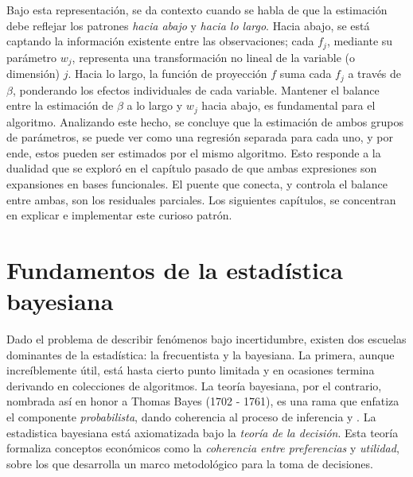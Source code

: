 \documentclass[../Main/Main.tex]{subfiles}
\begin{document}
Bajo esta representación, se da contexto cuando se habla de que la estimación debe reflejar los patrones \textit{hacia abajo} y \textit{hacia lo largo}. Hacia abajo, se está captando la información existente entre las observaciones;  cada $f_j$, mediante su parámetro $w_j$, representa una transformación no lineal de la variable (o dimensión) $j$. Hacia lo largo, la función de proyección $f$ suma cada $f_j$ a través de $\beta$, ponderando los efectos individuales de cada variable. Mantener el balance entre la estimación de $\beta$ a lo largo y $w_j$ hacia abajo, es fundamental para el algoritmo. Analizando este hecho, se concluye que la estimación de ambos grupos de parámetros, se puede ver como una regresión separada para cada uno, y por ende, estos pueden ser estimados por el mismo algoritmo. Esto responde a la dualidad que se exploró en el capítulo pasado de que ambas expresiones son expansiones en bases funcionales. El puente que conecta, y controla el balance entre ambas, son los residuales parciales. Los siguientes capítulos, se concentran en explicar e implementar este curioso patrón. 

\section{Fundamentos de la estadística bayesiana}
Dado el problema de describir fenómenos bajo incertidumbre, existen dos escuelas dominantes de la estadística: la frecuentista y la bayesiana. La primera, aunque increíblemente útil, está hasta cierto punto limitada y en ocasiones termina derivando en colecciones de algoritmos. La teoría bayesiana, por el contrario, nombrada así en honor a Thomas Bayes (1702 - 1761), es una rama que enfatiza el componente \textit{probabilista}, dando coherencia al proceso de inferencia \autocite{mendoza2011estadistica} y \autocite{bernardo2001bayesian}. La estadistica bayesiana está  axiomatizada bajo la \textit{teoría de la decisión}. Esta teoría formaliza conceptos económicos como la \textit{coherencia entre preferencias} y \textit{utilidad}, sobre los que desarrolla un marco metodológico para la toma de decisiones. \\\
\end{document}
